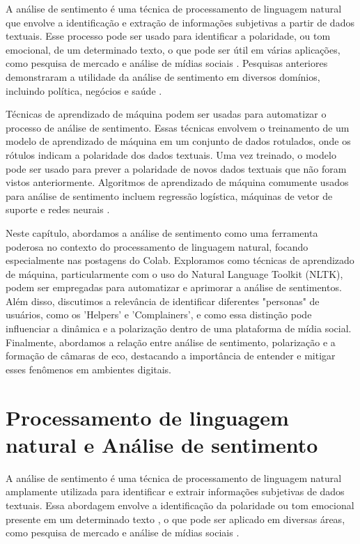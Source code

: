 A análise de sentimento é uma técnica de processamento de linguagem natural que envolve a identificação e extração de informações subjetivas a partir de dados textuais. Esse processo pode ser usado para identificar a polaridade, ou tom emocional, de um determinado texto, o que pode ser útil em várias aplicações, como pesquisa de mercado e análise de mídias sociais \cite{2008_Pang}. Pesquisas anteriores demonstraram a utilidade da análise de sentimento em diversos domínios, incluindo política, negócios e saúde \cite{2016_Chen_IP}.

Técnicas de aprendizado de máquina podem ser usadas para automatizar o processo de análise de sentimento. Essas técnicas envolvem o treinamento de um modelo de aprendizado de máquina em um conjunto de dados rotulados, onde os rótulos indicam a polaridade dos dados textuais. Uma vez treinado, o modelo pode ser usado para prever a polaridade de novos dados textuais que não foram vistos anteriormente. Algoritmos de aprendizado de máquina comumente usados para análise de sentimento incluem regressão logística, máquinas de vetor de suporte e redes neurais \cite{2013_Haddi}.

Neste capítulo, abordamos a análise de sentimento como uma ferramenta poderosa no contexto do processamento de linguagem natural, focando especialmente nas postagens do Colab. Exploramos como técnicas de aprendizado de máquina, particularmente com o uso do Natural Language Toolkit (NLTK), podem ser empregadas para automatizar e aprimorar a análise de sentimentos. Além disso, discutimos a relevância de identificar diferentes "personas" de usuários, como os 'Helpers' e 'Complainers', e como essa distinção pode influenciar a dinâmica e a polarização dentro de uma plataforma de mídia social. Finalmente, abordamos a relação entre análise de sentimento, polarização e a formação de câmaras de eco, destacando a importância de entender e mitigar esses fenômenos em ambientes digitais.

\section{Processamento de linguagem natural e Análise de sentimento}

A análise de sentimento é uma técnica de processamento de linguagem natural amplamente utilizada para identificar e extrair informações subjetivas de dados textuais. Essa abordagem envolve a identificação da polaridade ou tom emocional presente em um determinado texto \cite{2008_Pang}, o que pode ser aplicado em diversas áreas, como pesquisa de mercado e análise de mídias sociais \cite{2015_Nguyen}.


